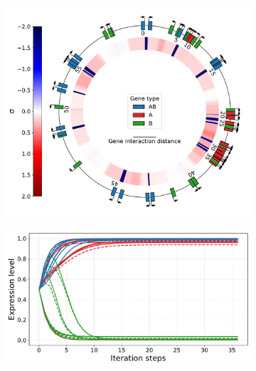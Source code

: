 \begin{figure}[H]
  \centering
  \begin{subfigure}[t]{0.42\textwidth}
    \includegraphics[width=\textwidth]{alife/img/genome_and_tsc_rep13_env_A.pdf}
    \label{subfig:alife:best_genome_A}
  \end{subfigure}
  \begin{subfigure}[t]{0.56\textwidth}
    \includegraphics[width=\textwidth]{alife/img/best_rep13_env_A.pdf}
    \label{subfig:alife:best_expr_A}
  \end{subfigure}
  \vspace{-5mm}


\end{figure}
